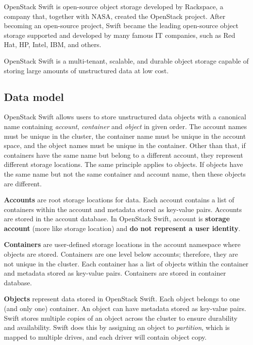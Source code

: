 \documentclass{ExcelAtFIT}
\begin{document}
OpenStack Swift is open-source object storage developed by Rackspace, a company that, together with NASA, created the OpenStack project. After becoming an open-source project, Swift became the leading open-source object storage supported and developed by many famous IT companies, such as Red Hat, HP, Intel, IBM, and others.

OpenStack Swift is a multi-tenant, scalable, and durable object storage capable of storing large amounts of unstructured data at low cost\cite{swiftOpenStackSwift}.

\subsection{Data model}

OpenStack Swift allows users to store unstructured data objects with a canonical name containing \textit{account}, \textit{container} and \textit{object} in given order\cite{swiftOpenStackSwift}. The account names must be unique in the cluster, the container name must be unique in the account space, and the object names must be unique in the container. Other than that, if containers have the same name but belong to a different account, they represent different storage locations. The same principle applies to objects. If objects have the same name but not the same container and account name, then these objects are different.

\textbf{Accounts} are root storage locations for data. Each account contains a list of containers within the account and metadata stored as key-value pairs. Accounts are stored in the account database. In OpenStack Swift, account is \textbf{storage account} (more like storage location) and \textbf{do not represent a user identity}\cite{swiftOpenStackSwift}.

\textbf{Containers} are user-defined storage locations in the account namespace where objects are stored. Containers are one level below accounts; therefore, they are not unique in the cluster. Each container has a list of objects within the container and metadata stored as key-value pairs. Containers are stored in container database\cite{swiftOpenStackSwift}.

\textbf{Objects} represent data stored in OpenStack Swift. Each object belongs to one (and only one) container. An object can have metadata stored as key-value pairs. Swift stores multiple copies of an object across the cluster to ensure durability and availability. Swift does this by assigning an object to \textit{partition}, which is mapped to multiple drives, and each driver will contain object copy\cite{swiftOpenStackSwift}.
\end{document}
